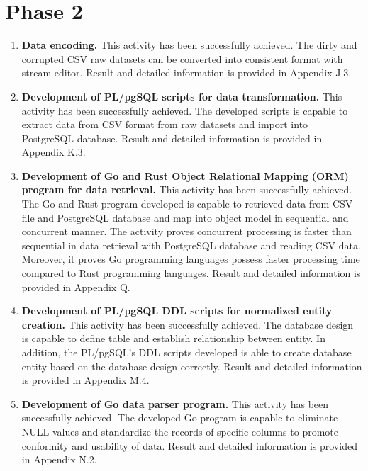 \section{Phase 2}

\begin{enumerate}[topsep=0pt,itemsep=-1ex,partopsep=1ex,parsep=1.5ex]
	
	\item \textbf{Data encoding.} This activity has been successfully achieved. The dirty and corrupted CSV raw datasets can be converted into consistent format with stream editor. Result and detailed information is provided in Appendix J.3.
	
	\item \textbf{Development of PL/pgSQL scripts for data transformation.} This activity has been successfully achieved. The developed scripts is capable to extract data from CSV format from raw datasets and import into PostgreSQL database. Result and detailed information is provided in Appendix K.3.
	
	\item \textbf{Development of Go and Rust Object Relational Mapping (ORM) program for data retrieval.} This activity has been successfully achieved. The Go and Rust program developed is capable to retrieved data from CSV file and PostgreSQL database and map into object model in sequential and concurrent manner. The activity proves concurrent processing is faster than sequential in data retrieval with PostgreSQL database and reading CSV data. Moreover, it proves Go programming languages possess faster processing time compared to Rust programming languages. Result and detailed information is provided in Appendix Q.
	
	\item \textbf{Development of PL/pgSQL DDL scripts for normalized entity creation.} This activity has been successfully achieved. The database design is capable to define table and establish relationship between entity. In addition, the PL/pgSQL's DDL scripts developed is able to create database entity based on the database design correctly. Result and detailed information is provided in Appendix M.4.
	
	\item \textbf{Development of Go data parser program.} This activity has been successfully achieved. The developed Go program is capable to eliminate NULL values and standardize the records of specific columns to promote conformity and usability of data. Result and detailed information is provided in Appendix N.2. 
	

\end{enumerate}
